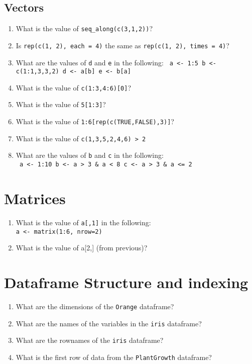 \documentclass[12pt,a4paper]{article}
\begin{document}
\subsection*{Vectors}
\begin{enumerate}
\item What is the value of \texttt{seq\_along(c(3,1,2))}?
\item Is \texttt{rep(c(1, 2), each = 4)} the same as \texttt{rep(c(1, 2), times = 4)}?
\vspace{1em}
\item What are the values of \texttt{d} and \texttt{e} in the following:
\texttt{
a <- 1:5
b <- c(1:1,3,3,2)
d <- a[b]
e <- b[a]
}
\vspace{1em}
\item What is the value of \texttt{c(1:3,4:6)[0]}?
\item What is the value of \texttt{5[1:3]}?
\vspace{1em}
\item What is the value of \texttt{1:6[rep(c(TRUE,FALSE),3)]}?
\item What is the value of \texttt{c(1,3,5,2,4,6) > 2}
\item What are the values of \texttt{b} and \texttt{c} in the following:\\
\texttt{
a <- 1:10
b <- a > 3 \& a < 8
c <- a > 3 \& a <= 2
}
\end{enumerate}


\section*{Matrices}
\begin{enumerate}
\item What is the value of \texttt{a[,1]} in the following:\\
\texttt{a <- matrix(1:6, nrow=2)}
\item What is the value of {a[2,]} (from previous)?
\end{enumerate}


\section*{Dataframe Structure and indexing}
\begin{enumerate}
\item What are the dimensions of the \texttt{Orange} dataframe?
\item What are the names of the variables in the \texttt{iris} dataframe?
\item What are the rownames of the \texttt{iris} dataframe?
\item What is the first row of data from the \texttt{PlantGrowth} dataframe?
\end{enumerate}
\end{document}
